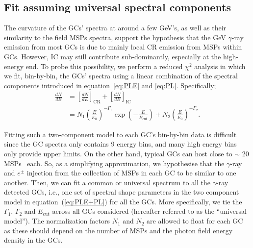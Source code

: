 \documentclass[doublespace,nopageskip]{VTthesis} %
\begin{document}
\subsection{Fit assuming universal spectral components}\label{sec:spectra_global}

The curvature of the GCs' spectra at around a few GeV's, as well as their similarity to the field MSPs spectra, support the hypothesis that the GeV $\gamma$-ray emission from most GCs is due to mainly local CR emission from MSPs within GCs. However, IC may still contribute sub-dominantly, especially at the high-energy end. To probe this possibility, we perform a reduced $\chi^2$ analysis in which we fit, bin-by-bin, the  GCs' spectra using a linear combination of the spectral components introduced in equation~\ref{eq:PLE} and \ref{eq:PL}. Specifically;
\begin{align}\label{eq:PLE+PL}
    \frac{dN}{dE} &= \left[ \frac{dN}{dE} \right]_\mathrm{CR} + \left[ \frac{dN}{dE} \right]_\mathrm{IC} \\\nonumber
    &= N_1\left( \frac{E}{E_0} \right)^{-\Gamma_1}\exp\left(-\frac{E}{E_\mathrm{cut}}\right) + N_2\left(\frac{E}{E_0}\right)^{-\Gamma_2}.
\end{align}

Fitting such a two-component model to each GC's bin-by-bin data is difficult since the GC spectra only contains 9 energy bins, and many high energy bins only provide upper limits. On the other hand, typical GCs can host close to $\sim$ 20 MSPs~\citep{2019ApJ...877..122Y} each. So, as a simplifying approximation, we hypothesise that the $\gamma$-ray and $e^\pm$ injection from the collection of MSPs in each GC to be similar to one another. Then, we can fit a common or universal spectrum to all the $\gamma$-ray detected GCs, i.e., one set of spectral shape parameters in the two component model in equation~(\ref{eq:PLE+PL}) for all the GCs. More specifically, we tie the $\Gamma_1$, $\Gamma_2$ and $E_\mathrm{cut}$ across all GCs considered (hereafter referred to as the ``universal model''). The normalization factors $N_1$ and $N_2$ are allowed to float for each GC as these should depend on the number of MSPs and the photon field energy density in the GCs.
\end{document}

